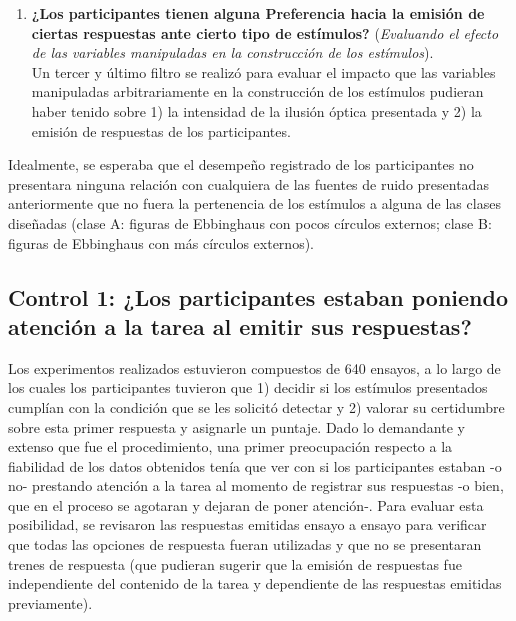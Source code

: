 \begin{enumerate}
\item \textbf{¿Los participantes tienen alguna Preferencia hacia la emisión de ciertas respuestas ante cierto tipo de estímulos?} (\textit{Evaluando el efecto de las variables manipuladas en la construcción de los estímulos}).\\

Un tercer y último filtro se realizó para evaluar el impacto que las variables manipuladas arbitrariamente en la construcción de los estímulos pudieran haber tenido sobre 1) la intensidad de la ilusión óptica presentada y 2) la emisión de respuestas de los participantes.\\

\end{enumerate}

Idealmente, se esperaba que el desempeño registrado de los participantes no presentara ninguna relación con cualquiera de las fuentes de ruido presentadas anteriormente que no fuera la pertenencia de los estímulos a alguna de las clases diseñadas (clase A: figuras de Ebbinghaus con pocos círculos externos; clase B: figuras de Ebbinghaus con más círculos externos).\\






\subsection{Control 1: ¿Los participantes estaban poniendo atención a la tarea al emitir sus respuestas?}

Los experimentos realizados estuvieron compuestos de 640 ensayos, a lo largo de los cuales los participantes tuvieron que 1) decidir si los estímulos presentados cumplían con la condición que se les solicitó detectar y 2) valorar su certidumbre sobre esta primer respuesta y asignarle un puntaje. Dado lo demandante y extenso que fue el procedimiento, una primer preocupación respecto a la fiabilidad de los datos obtenidos tenía que ver con si los participantes estaban -o no- prestando atención a la tarea al momento de registrar sus respuestas -o bien, que en el proceso se agotaran y dejaran de poner atención-. Para evaluar esta posibilidad, se revisaron las respuestas emitidas ensayo a ensayo para verificar que todas las opciones de respuesta fueran utilizadas y que no se presentaran trenes de respuesta (que pudieran sugerir que la emisión de respuestas fue independiente del contenido de la tarea y dependiente de las respuestas emitidas previamente).\\

